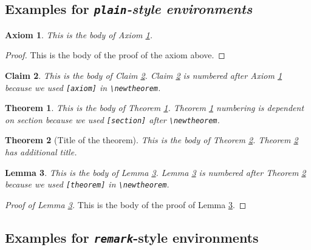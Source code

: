 \documentclass[aoas]{imsart}
\numberwithin{equation}{section}
\theoremstyle{plain}
\newtheorem{axiom}{Axiom}
\newtheorem{claim}[axiom]{Claim}
\newtheorem{theorem}{Theorem}[section]
\newtheorem{lemma}[theorem]{Lemma}
\theoremstyle{remark}
\begin{document}
\hypertarget{examples-for-plain-style-environments}{%
\subsection{\texorpdfstring{Examples for \emph{\texttt{plain}-style
environments}}{Examples for plain-style environments}}\label{examples-for-plain-style-environments}}

\begin{axiom}
\label{ax1} This is the body of Axiom \ref{ax1}.

\end{axiom}

\begin{proof}
This is the body of the proof of the axiom above.

\end{proof}

\begin{claim}
\label{cl1} This is the body of Claim \ref{cl1}. Claim \ref{cl1} is
numbered after Axiom \ref{ax1} because we used \verb|[axiom]| in
\verb|\newtheorem|.

\end{claim}

\begin{theorem}
\label{th1} This is the body of Theorem \ref{th1}. Theorem \ref{th1}
numbering is dependent on section because we used \verb|[section]| after
\verb|\newtheorem|.

\end{theorem}

\begin{theorem}[Title of the theorem]
\label{th2} This is the body of Theorem \ref{th2}. Theorem \ref{th2} has
additional title.

\end{theorem}

\begin{lemma}
\label{le1} This is the body of Lemma \ref{le1}. Lemma \ref{le1} is
numbered after Theorem \ref{th2} because we used \verb|[theorem]| in
\verb|\newtheorem|.

\end{lemma}

\begin{proof}[Proof of Lemma \ref{le1}]
This is the body of the proof of Lemma \ref{le1}.

\end{proof}

\hypertarget{examples-for-remark-style-environments}{%
\subsection{\texorpdfstring{Examples for \emph{\texttt{remark}}-style
environments}{Examples for remark-style environments}}\label{examples-for-remark-style-environments}}
\end{document}
